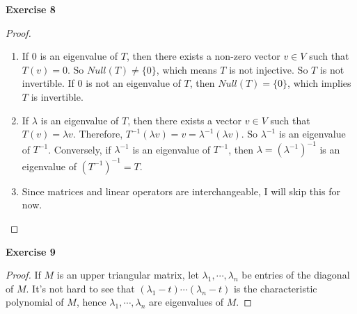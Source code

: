 \documentclass[12pt, a4paper]{article}
\theoremstyle{plain}
\newenvironment{exercise}[2][Exercise]
    { \begin{mdframed}[backgroundcolor=gray!20] \textbf{#1 #2} \\}
    {  \end{mdframed}}
\begin{document}
\begin{exercise}{8}

\end{exercise}
	\begin{proof}
	\hfill
	\begin{enumerate}[label=(\alph*)]
	\item If $0$ is an eigenvalue of $T$, then there exists a non-zero vector $v\in V$ such that $T(v)=0$. So $Null(T)\neq\{0\}$, which means $T$ is not injective. So $T$ is not invertible. If $0$ is not an eigenvalue of $T$, then $Null(T)=\{0\}$, which implies $T$ is invertible.
	
	\item If $\lambda$ is an eigenvalue of $T$, then there exists a vector $v\in V$ such that $T(v)=\lambda v$. Therefore, $T^{-1}(\lambda v)=v=\lambda^{-1}(\lambda v)$. So $\lambda^{-1}$ is an eigenvalue of $T^{-1}$. Conversely, if $\lambda^{-1}$ is an eigenvalue of $T^{-1}$, then $\lambda = (\lambda^{-1})^{-1}$ is an eigenvalue of $(T^{-1})^{-1}=T$.
	
	\item Since matrices and linear operators are interchangeable, I will skip this for now.
	\end{enumerate}
	\end{proof}
	
\begin{exercise}{9}

\end{exercise}
	\begin{proof}
	If $M$ is an upper triangular matrix, let $\lambda_1,\cdots,\lambda_n$ be entries of the diagonal of $M$. It's not hard to see that $(\lambda_1-t)\cdots(\lambda_n-t)$ is the characteristic polynomial of $M$, hence $\lambda_1,\cdots,\lambda_n$ are eigenvalues of $M$.
	\end{proof}

\pagebreak
\end{document}
